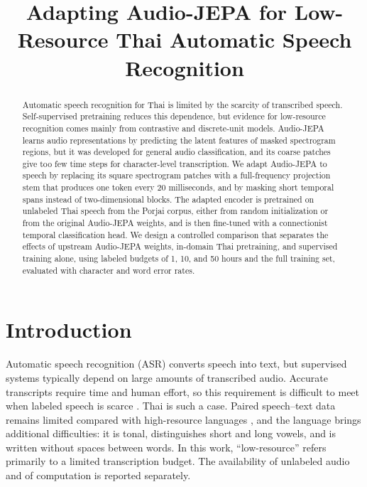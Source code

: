 \documentclass[conference]{IEEEtran}
\begin{document}
\title{Adapting Audio-JEPA for Low-Resource Thai Automatic Speech Recognition}

\author{
}

\maketitle

\begin{abstract}
Automatic speech recognition for Thai is limited by the scarcity of transcribed speech. Self-supervised pretraining reduces this dependence, but evidence for low-resource recognition comes mainly from contrastive and discrete-unit models. Audio-JEPA learns audio representations by predicting the latent features of masked spectrogram regions, but it was developed for general audio classification, and its coarse patches give too few time steps for character-level transcription. We adapt Audio-JEPA to speech by replacing its square spectrogram patches with a full-frequency projection stem that produces one token every 20 milliseconds, and by masking short temporal spans instead of two-dimensional blocks. The adapted encoder is pretrained on unlabeled Thai speech from the Porjai corpus, either from random initialization or from the original Audio-JEPA weights, and is then fine-tuned with a connectionist temporal classification head. We design a controlled comparison that separates the effects of upstream Audio-JEPA weights, in-domain Thai pretraining, and supervised training alone, using labeled budgets of 1, 10, and 50 hours and the full training set, evaluated with character and word error rates.
\end{abstract}

\section{Introduction}
\label{sec:intro}

Automatic speech recognition (ASR) converts speech into text, but supervised systems typically depend on large amounts of transcribed audio. Accurate transcripts require time and human effort, so this requirement is difficult to meet when labeled speech is scarce \cite{conneau2021xlsr}. Thai is such a case. Paired speech--text data remains limited compared with high-resource languages \cite{shao2025xlsrthai}, and the language brings additional difficulties: it is tonal, distinguishes short and long vowels, and is written without spaces between words. In this work, ``low-resource'' refers primarily to a limited transcription budget. The availability of unlabeled audio and of computation is reported separately.
\end{document}
